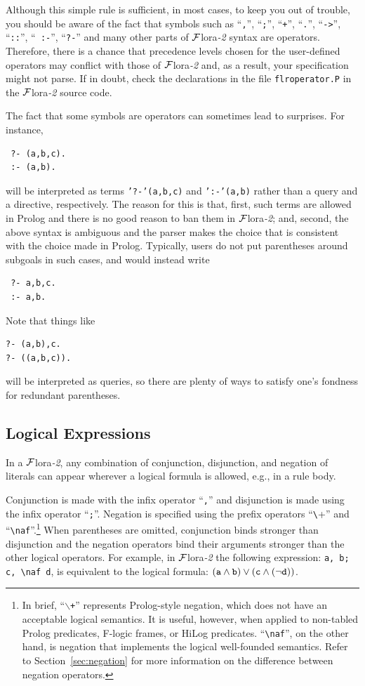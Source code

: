 \documentclass[11pt]{article}
\newcommand{\FLORA}{{\mbox{\sc ${\cal F}${lora}\rm\emph{-2}}}\xspace}
\newcommand{\FLSYSTEM}{\FLORA}
\newcommand{\bs}{\textbackslash}
\newcommand{\PLGNAF}{\mbox{\texttt{\bs}+}\xspace}
\newcommand{\RULELOGNAF}{{\texttt{{\bs}naf}}\xspace}
\begin{document}
Although this simple rule is sufficient, in most cases, to keep you out of
trouble, you should be aware of the fact that symbols such as ``{\tt ,}'',
``{\tt ;}'', ``{\tt +}'', ``{\tt .}'', ``{\tt ->}'', ``{\tt ::}'', ``{\tt
  :-}'', ``{\tt ?-}'' and many
other parts of \FLSYSTEM syntax are operators. Therefore, there is a chance
that precedence levels chosen for the user-defined operators may conflict with
those of \FLSYSTEM and, as a result, your specification might not parse. If in
doubt, check the declarations in the file {\tt flroperator.P} in the \FLSYSTEM
source code.

The fact that some symbols are operators can sometimes lead to
surprises. For instance,
\begin{verbatim}
 ?- (a,b,c).
 :- (a,b).
\end{verbatim}
will be interpreted as terms {\tt '?-'(a,b,c)} and {\tt ':-'(a,b)} rather
than a query and a directive, respectively. The reason for this is that,
first, such terms are allowed in Prolog and there is no good reason to ban
them in \FLSYSTEM; and, second, the above syntax is ambiguous and the parser
makes the choice that is consistent with the choice made in
Prolog. Typically, users do not put parentheses around subgoals in such
cases, and would instead write
\begin{verbatim}
 ?- a,b,c.
 :- a,b.  
\end{verbatim}
Note that things like
\begin{verbatim}
?- (a,b),c.  
?- ((a,b,c)).
\end{verbatim}
will be interpreted as queries, so there are plenty of ways to satisfy
one's fondness for redundant parentheses.


\subsection{Logical Expressions}


%
In a \FLSYSTEM, any combination of conjunction, disjunction, and
negation of literals can appear wherever a logical formula is allowed,
e.g., in a rule body.

Conjunction is made with the infix operator ``{\tt ,}'' and
disjunction is made using the infix operator ``{\tt ;}''.  Negation is
specified
using the prefix operators ``\PLGNAF'' and ``\RULELOGNAF''.\footnote{
  In brief, ``{\tt $\backslash$+}'' represents Prolog-style negation, which
  does not have an acceptable logical semantics. It is useful, however,
  when applied
  to non-tabled Prolog predicates, F-logic frames, or HiLog
  predicates. ``\RULELOGNAF'', on the other hand, is negation that
  implements the logical well-founded semantics.  Refer to
  Section~\ref{sec:negation} for more information on the difference between
  negation operators. 
  }
When parentheses are omitted, conjunction binds stronger than disjunction
and the negation operators bind their arguments stronger than the other
logical operators.  For example, in \FLSYSTEM the following expression:
{\tt a, b; c, \RULELOGNAF d}, is equivalent to the logical formula: $\tt (a
\wedge b) \vee (c \wedge (\neg d))$.
\end{document}
